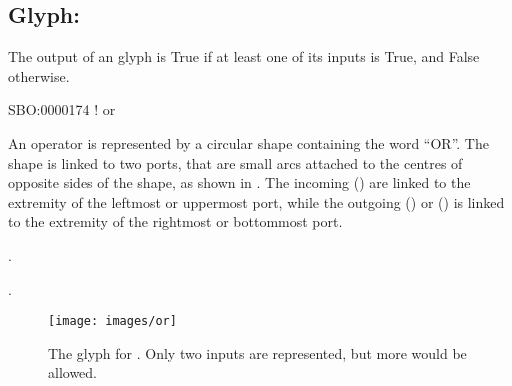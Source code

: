 \subsection{Glyph: }
\label{sec:or}

{
The output of an  glyph is True if at least one of its inputs is True, and False otherwise.
}

\begin{glyphDescription}

\glyphSboTerm
SBO:0000174 ! or



\glyphContainer
An  operator is represented by a circular shape containing the word ``OR''.
The shape is linked to two ports, that are small arcs attached to the centres of opposite sides of the shape, as shown in .
The incoming  () are linked to the extremity of the leftmost or uppermost port, while the outgoing  () or  () is linked to the extremity of the rightmost or bottommost port.

\glyphLabel
{}.

\glyphAux
{}.

\end{glyphDescription}

\begin{figure}[H]
  \centering
  \texttt{[image: images/or]}
  \caption{The \PD glyph for . Only two inputs are represented, but more would be allowed.}
  \label{fig:or}
\end{figure}
